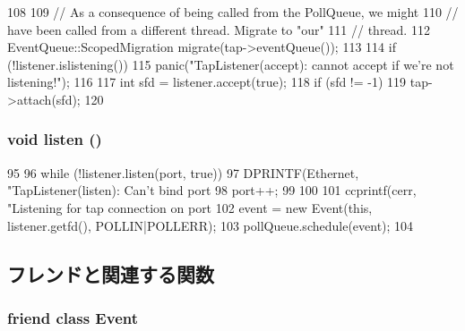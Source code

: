\begin{DoxyCode}
108 {
109     // As a consequence of being called from the PollQueue, we might
110     // have been called from a different thread. Migrate to "our"
111     // thread.
112     EventQueue::ScopedMigration migrate(tap->eventQueue());
113 
114     if (!listener.islistening())
115         panic("TapListener(accept): cannot accept if we're not listening!");
116 
117     int sfd = listener.accept(true);
118     if (sfd != -1)
119         tap->attach(sfd);
120 }
\end{DoxyCode}
\hypertarget{classTapListener_a458bbe4cf81360301586b2e62a7f9dd2}{
\subsubsection[{listen}]{\setlength{\rightskip}{0pt plus 5cm}void listen ()}}
\label{classTapListener_a458bbe4cf81360301586b2e62a7f9dd2}



\begin{DoxyCode}
95 {
96     while (!listener.listen(port, true)) {
97         DPRINTF(Ethernet, "TapListener(listen): Can't bind port %
98         port++;
99     }
100 
101     ccprintf(cerr, "Listening for tap connection on port %
102     event = new Event(this, listener.getfd(), POLLIN|POLLERR);
103     pollQueue.schedule(event);
104 }
\end{DoxyCode}


\subsection{フレンドと関連する関数}
\hypertarget{classTapListener_a3c7b3c89bf96f51e80a919b3a82a3915}{
\subsubsection[{Event}]{\setlength{\rightskip}{0pt plus 5cm}friend class {\bf Event}}}
\label{classTapListener_a3c7b3c89bf96f51e80a919b3a82a3915}


